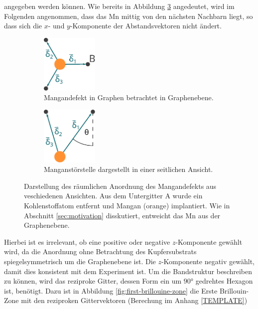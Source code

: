 angegeben werden können.
Wie bereits in Abbildung \ref{fig:mangan_impurity} angedeutet, wird im Folgenden angenommen, dass das Mn mittig von den nächsten Nachbarn liegt, so dass 
sich die $x$- und $y$-Komponente der Abstandsvektoren nicht ändert.
\begin{figure}
    \begin{subfigure}{0.48\textwidth}%
    \centering%
    \includegraphics[height = 2.8cm]{Plots/mangan_impurity_inplane.pdf}%
    \caption{Mangandefekt in Graphen betrachtet in Graphenebene.}%
    \label{fig:mangan_impurity_inplane}%
    \end{subfigure}%
    \hfill%
    \begin{subfigure}{0.48\textwidth}%
    \centering%
    \includegraphics[height = 2.8cm]{Plots/mangan_impurity_z_component.pdf}%
    \caption{Manganstörstelle dargestellt in einer seitlichen Ansicht.}%
    \label{fig:mangan_impurity_z_component}%
    \end{subfigure}%
    \caption{Darstellung des räumlichen Anordnung des Mangandefekts aus veschiedenen Ansichten.
    Aus dem Untergitter A wurde ein Kohlenstoffatom entfernt und Mangan (orange) implantiert.
    Wie in Abschnitt \ref{sec:motivation} disskutiert, entweicht das Mn aus der Graphenebene.}%
    \label{fig:mangan_impurity}%
\end{figure}%
Hierbei ist es irrelevant, ob eine positive oder negative $z$-Komponente gewählt wird, da die Anordnung ohne Betrachtung des Kupfersubstrats 
spiegelsymmetrisch um die Graphenebene ist. 
Die $z$-Komponente negativ gewählt, damit dies konsistent mit dem Experiment ist.
Um die Bandstruktur beschreiben zu können, wird das reziproke Gitter, 
dessen Form ein um $\ang{90;;}$ gedrehtes Hexagon ist, benötigt.
Dazu ist in Abbildung \ref{fig:first-brillouine-zone} die Erste Brillouin-Zone mit den 
reziproken Gittervektoren (Berechung im Anhang \ref{TEMPLATE})
